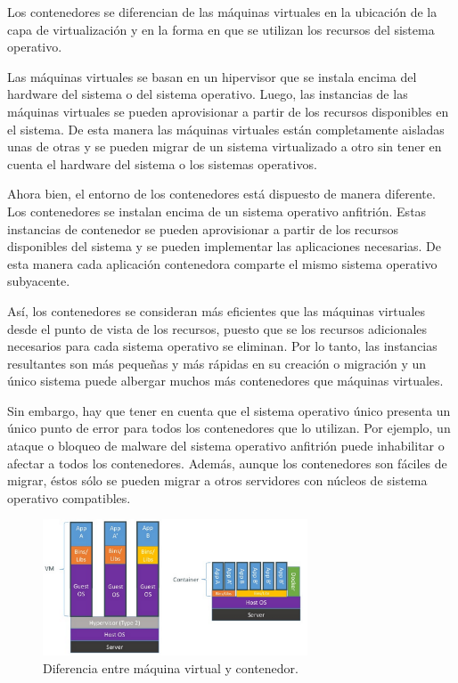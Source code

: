 Los contenedores se diferencian de las máquinas virtuales en la ubicación de la capa de virtualización y en la forma en que se utilizan los recursos del sistema operativo.

Las máquinas virtuales se basan en un hipervisor que se instala encima del hardware del sistema o del sistema operativo. Luego, las instancias de las máquinas virtuales se pueden aprovisionar a partir de los recursos disponibles en el sistema. De esta manera las máquinas virtuales están completamente aisladas unas de otras y se pueden migrar de un sistema virtualizado a otro sin tener en cuenta el hardware del sistema o los sistemas operativos.

Ahora bien, el entorno de los contenedores está dispuesto de manera diferente. Los contenedores se instalan encima de un sistema operativo anfitrión. Estas instancias de contenedor se pueden aprovisionar a partir de los recursos disponibles del sistema y se pueden implementar las aplicaciones necesarias. De esta manera cada aplicación contenedora comparte el mismo sistema operativo subyacente.

Así, los contenedores se consideran más eficientes que las máquinas virtuales desde el punto de vista de los recursos, puesto que se los recursos adicionales necesarios para cada sistema operativo se eliminan. Por lo tanto, las instancias resultantes son más pequeñas y más rápidas en su creación o migración y un único sistema puede albergar muchos más contenedores que máquinas virtuales.

Sin embargo, hay que tener en cuenta que el sistema operativo único presenta un único punto de error para todos los contenedores que lo utilizan. Por ejemplo, un ataque o bloqueo de malware del sistema operativo anfitrión puede inhabilitar o afectar a todos los contenedores. Además, aunque los contenedores son fáciles de migrar, éstos sólo se pueden migrar a otros servidores con núcleos de sistema operativo compatibles.

\begin{figure}[H]
\centering
\includegraphics[width=0.7\textwidth]{images/figures/containervsmv.png}
\caption{Diferencia entre máquina virtual y contenedor.\label{fig:figure_placement_example}}
\end{figure}

